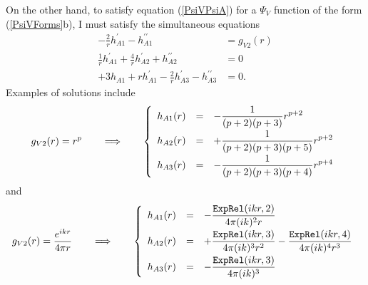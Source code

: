 \documentclass[letterpaper]{article}
\begin{document}
On the other hand, to satisfy equation (\ref{PsiVPsiA}) for a $\Psi_V$ 
function of the form (\ref{PsiVForms}b), I must satisfy the simultaneous
equations
\begin{align*}
  - \frac{2}{r}h^\prime_{A1} -h^{\prime\prime}_{A1} 
&= g_{V2}(r) 
\\
 \frac{1}{r} h^\prime_{A1} + \frac{4}{r}h^\prime_{A2}
 +h^{\prime\prime}_{A2}
&=0
\\
 +3h_{A1} + r h_{A1}^\prime
          - \frac{2}{r}h^\prime_{A3} - h^{\prime\prime}_{A3}
&=0.
\end{align*}
Examples of solutions include
$$
 g_{V2}(r) 
 = 
 \displaystyle{ r^p  }
 \qquad \Longrightarrow \qquad
 \left\{
 \begin{array}{ccl}
 \displaystyle{ h_{A1}(r) }
 &=& 
 \displaystyle{-\frac{1}{(p+2)(p+3)} r^{p+2}}
\\[8pt]
 \displaystyle{ h_{A2}(r) }
 &=& 
 \displaystyle{+\frac{1}{(p+2)(p+3)(p+5)} r^{p+2}}
\\[8pt]
 \displaystyle{ h_{A3}(r) }
 &=& 
 \displaystyle{-\frac{1}{(p+2)(p+3)(p+4)} r^{p+4}}
\\ 
 \end{array}
 \right.
\\[12pt]
$$
and
$$
 g_{V2}(r) 
 = 
 \displaystyle{ \frac{e^{ikr}}{4\pi r}  }
 \qquad \Longrightarrow \qquad
 \left\{
 \begin{array}{ccl}
 \displaystyle{ h_{A1}(r) }
 &=& 
 \displaystyle{-\frac{\texttt{ExpRel}(ikr,2)}{4\pi (ik)^2 r}}
\\[8pt]
 \displaystyle{ h_{A2}(r) }
 &=& 
 \displaystyle{+\frac{\texttt{ExpRel}(ikr,3)}{4\pi (ik)^3 r^2}
               -\frac{\texttt{ExpRel}(ikr,4)}{4\pi (ik)^4 r^3}
              }
\\[8pt]
 \displaystyle{ h_{A3}(r) }
 &=& 
 \displaystyle{-\frac{\texttt{ExpRel}(ikr,3)}{4\pi (ik)^3}}
\\ 
 \end{array}
 \right.
\\[12pt]
$$

\newpage


\end{document}
